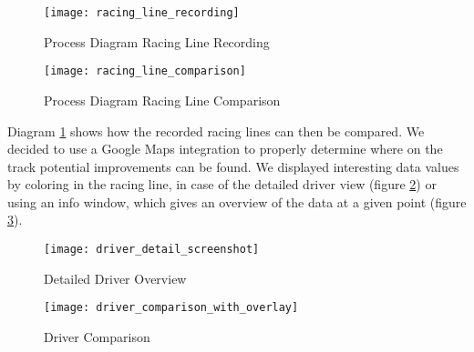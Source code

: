 \begin{figure}[!ht]
	\begin{minipage}[b]{.45\textwidth}
		\label{fig:racing_line_recording}
		\centering
		\texttt{[image: racing\_line\_recording]}
		\caption{Process Diagram Racing Line Recording}
	\end{minipage}
	\hfill
	\begin{minipage}[b]{.45\textwidth}
		\label{fig:racing_line_comparison}
		\centering
		\texttt{[image: racing\_line\_comparison]}
		\caption{Process Diagram Racing Line Comparison}
	\end{minipage}
\end{figure}

Diagram \ref{fig:racing_line_comparison} shows how the recorded racing lines can then be compared. We decided to use a Google Maps integration to properly determine where on the track potential improvements can be found. We displayed interesting data values by coloring in the racing line, in case of the detailed driver view (figure \ref{fig:driver_detail}) or using an info window, which gives an overview of the data at a given point (figure \ref{fig:comparison_with_overlay}).

\begin{figure}[!ht]
	\label{fig:driver_detail}
	\texttt{[image: driver\_detail\_screenshot]}
	\caption{Detailed Driver Overview}
\end{figure}
\begin{figure}[!ht]
	\label{fig:comparison_with_overlay}
	\texttt{[image: driver\_comparison\_with\_overlay]}
	\caption{Driver Comparison}
\end{figure}

\clearpage